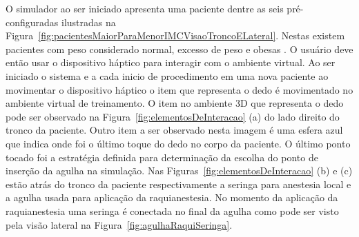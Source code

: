 O simulador ao ser iniciado apresenta uma paciente dentre as seis pré-configuradas ilustradas na Figura~\ref{fig:pacientesMaiorParaMenorIMCVisaoTroncoELateral}. Nestas existem pacientes com peso considerado normal, excesso de peso e obesas \cite{MTILLC2019}. O usuário deve então usar o dispositivo háptico para interagir com o ambiente virtual. Ao ser iniciado o sistema e a cada inicio de procedimento em uma nova paciente ao movimentar o dispositivo háptico o item que representa o dedo é movimentado no ambiente virtual de treinamento. O item no ambiente 3D que representa o dedo pode ser observado na Figura~\ref{fig:elementosDeInteracao} (a) do lado direito do tronco da paciente. Outro item a ser observado nesta imagem é uma esfera azul que indica onde foi o último toque do dedo no corpo da paciente. O último ponto tocado foi a estratégia definida para determinação da escolha do ponto de inserção da agulha na simulação. Nas Figuras~\ref{fig:elementosDeInteracao} (b) e (c) estão atrás do tronco da paciente respectivamente a seringa para anestesia local e a agulha usada para aplicação da raquianestesia. No momento da aplicação da raquianestesia uma seringa é conectada no final da agulha como pode ser visto pela visão lateral na Figura~\ref{fig:agulhaRaquiSeringa}.

